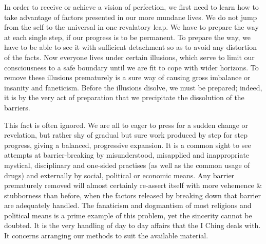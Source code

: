 \documentclass[11pt]{book}
\begin{document}
In order to receive or achieve a vision of perfection, we first need to learn how to take advantage of factors presented in our more mundane lives. We do not jump from the self to the universal in one revalatory leap. We have to prepare the way at each single step, if our progress is to be permanent. To prepare the way, we have to be able to see it with sufficient detachment so as to avoid any distortion of the facts. Now everyone lives under certain illusions, which serve to limit our consciousness to a safe boundary until we are fit to cope with wider horizons. To remove these illusions prematurely is a sure way of causing gross imbalance or insanity and faneticism. Before the illusions disolve, we must be prepared; indeed, it is by the very act of preparation that we precipitate the dissolution of the barriers.

This fact is often ignored. We are all to eager to press for a sudden change or revelation, but rather shy of gradual but sure work produced by step for step progress, giving a balanced, progressive expansion. It is a common sight to see attempts at barrier-breaking by misunderstood, misapplied and inappropriate mystical, disciplinary and one-sided practises (as well as the common usage of drugs) and externally by social, political or economic means. Any barrier prematurely removed will almost certainly re-assert itself with more vehemence \& stubborness than before, when the factors released by breaking down that barrier are adequately handled. The fanaticism and dogmantism of most religions and political means is a prime example of this problem, yet the sincerity cannot be doubted. It is the very handling of day to day affairs that the I Ching deals with. It concerns arranging our methods to suit the available material.
\end{document}
